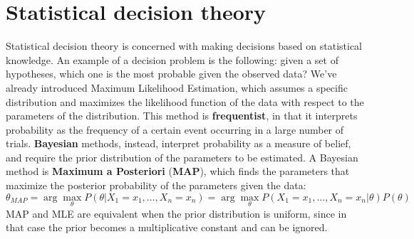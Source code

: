 \section{Statistical decision theory}

Statistical decision theory is concerned with making decisions based on statistical knowledge. An example of a decision problem is the following: given a set of hypotheses, which one is the most probable given the observed data? We've already introduced Maximum Likelihood Estimation, which assumes a specific distribution and maximizes the likelihood function of the data with respect to the parameters of the distribution. This method is \textbf{frequentist}, in that it interprets probability as the frequency of a certain event occurring in a large number of trials. \textbf{Bayesian} methods, instead, interpret probability as a measure of belief, and require the prior distribution of the parameters to be estimated. A Bayesian method is \textbf{Maximum a Posteriori} (\textbf{MAP}), which finds the parameters that maximize the posterior probability of the parameters given the data:
\begin{equation*}
    \theta_{MAP} = \arg \max_{\theta} P(\theta | X_1 = x_1, \ldots, X_n = x_n) = \arg \max_{\theta} P(X_1 = x_1, \ldots, X_n = x_n| \theta) P(\theta)
\end{equation*}
MAP and MLE are equivalent when the prior distribution is uniform, since in that case the prior becomes a multiplicative constant and can be ignored.

